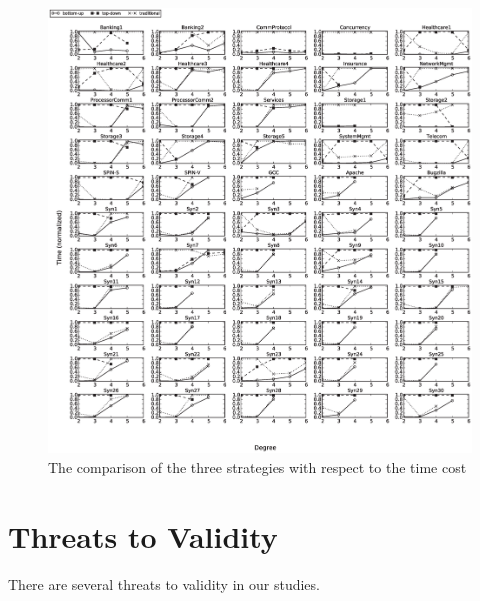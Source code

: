 \documentclass[conference]{IEEEtran}
\theoremstyle{definition}
\begin{document}
\begin{figure}[htbp]
\center
 \includegraphics[width=7.4in]{time.eps}
\caption{The comparison of the three strategies with respect to the time cost}
\label{experiement_time}
\end{figure}


\section{Threats to Validity}
There are several threats to validity in our studies.
\end{document}
